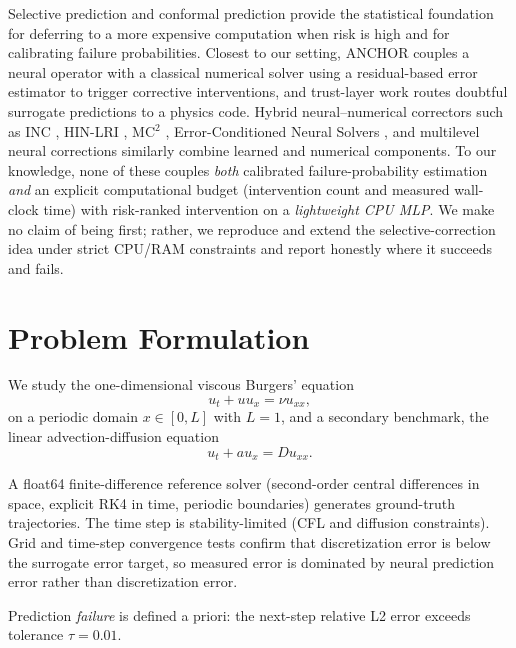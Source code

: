 \documentclass[11pt]{article}
\begin{document}
Selective prediction \citep{geifman2017selective} and conformal prediction \citep{romano2019conformalized} provide the statistical foundation for deferring to a more expensive computation when risk is high and for calibrating failure probabilities. Closest to our setting, ANCHOR \citep{roy2025anchor} couples a neural operator with a classical numerical solver using a residual-based error estimator to trigger corrective interventions, and trust-layer work \citep{vakhshouri2026trust} routes doubtful surrogate predictions to a physics code. Hybrid neural--numerical correctors such as INC \citep{wei2025inc}, HIN-LRI \citep{liang2026hin}, MC$^2$ \citep{hsu2026mc2}, Error-Conditioned Neural Solvers \citep{jiang2026ens}, and multilevel neural corrections \citep{yang2026multilevel} similarly combine learned and numerical components. To our knowledge, none of these couples \emph{both} calibrated failure-probability estimation \emph{and} an explicit computational budget (intervention count and measured wall-clock time) with risk-ranked intervention on a \emph{lightweight CPU MLP}. We make no claim of being first; rather, we reproduce and extend the selective-correction idea under strict CPU/RAM constraints and report honestly where it succeeds and fails.

\section{Problem Formulation}
We study the one-dimensional viscous Burgers' equation
\begin{equation}
u_t + u u_x = \nu u_{xx},
\end{equation}
on a periodic domain $x\in[0,L]$ with $L=1$, and a secondary benchmark, the linear advection-diffusion equation
\begin{equation}
u_t + a u_x = D u_{xx}.
\end{equation}

A float64 finite-difference reference solver (second-order central differences in space, explicit RK4 in time, periodic boundaries) generates ground-truth trajectories. The time step is stability-limited (CFL and diffusion constraints). Grid and time-step convergence tests confirm that discretization error is below the surrogate error target, so measured error is dominated by neural prediction error rather than discretization error.

Prediction \emph{failure} is defined a priori: the next-step relative L2 error exceeds tolerance $\tau=0.01$.
\end{document}
